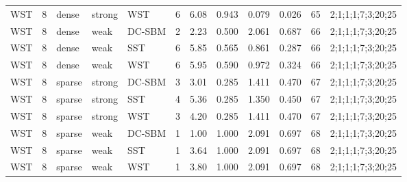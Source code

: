 \begin{table}[!h]
\begin{tabular}[t]{llllllllllll}
WST & 8 & dense & strong & WST & 6 & 6.08 & 0.943 & 0.079 & 0.026 & 65 & 2;1;1;1;7;3;20;25\\
WST & 8 & dense & weak & DC-SBM & 2 & 2.23 & 0.500 & 2.061 & 0.687 & 66 & 2;1;1;1;7;3;20;25\\
WST & 8 & dense & weak & SST & 6 & 5.85 & 0.565 & 0.861 & 0.287 & 66 & 2;1;1;1;7;3;20;25\\
WST & 8 & dense & weak & WST & 6 & 5.95 & 0.590 & 0.972 & 0.324 & 66 & 2;1;1;1;7;3;20;25\\
WST & 8 & sparse & strong & DC-SBM & 3 & 3.01 & 0.285 & 1.411 & 0.470 & 67 & 2;1;1;1;7;3;20;25\\
WST & 8 & sparse & strong & SST & 4 & 5.36 & 0.285 & 1.350 & 0.450 & 67 & 2;1;1;1;7;3;20;25\\
WST & 8 & sparse & strong & WST & 3 & 4.20 & 0.285 & 1.411 & 0.470 & 67 & 2;1;1;1;7;3;20;25\\
WST & 8 & sparse & weak & DC-SBM & 1 & 1.00 & 1.000 & 2.091 & 0.697 & 68 & 2;1;1;1;7;3;20;25\\
WST & 8 & sparse & weak & SST & 1 & 3.64 & 1.000 & 2.091 & 0.697 & 68 & 2;1;1;1;7;3;20;25\\
WST & 8 & sparse & weak & WST & 1 & 3.80 & 1.000 & 2.091 & 0.697 & 68 & 2;1;1;1;7;3;20;25\\
\bottomrule
\end{tabular}
\end{table}
